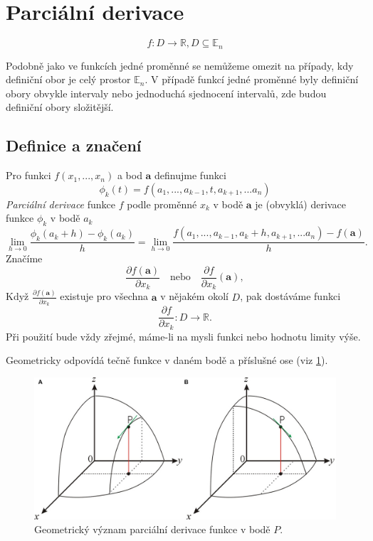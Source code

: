 \documentclass[../main.tex]{subfiles}
\begin{document}
\section{Parciální derivace}

\begin{definition}
	\[f: D \rightarrow \mathbb{R}, D \subseteq \mathbb{E}_n\]
\end{definition}

Podobně jako ve funkcích jedné proměnné se nemůžeme omezit na případy, kdy definiční obor je celý prostor $\mathbb{E}_n$.
V případě funkcí jedné proměnné byly definiční obory obvykle intervaly nebo jednoduchá sjednocení intervalů, zde budou definiční obory složitější.

\subsection{Definice a značení}
\begin{definition}
	Pro funkci $f(x_1,...,x_n)$ a bod \(\textbf{a}\) definujme funkci
	\[\phi_k(t) = f(a_1,...,a_{k-1},t,a_{k+1},...a_n)\]
	\textit{Parciální derivace} funkce $f$ podle proměnné $x_k$ v bodě $\textbf{a}$ je (obvyklá) derivace funkce $\phi_k$ v bodě \(a_k\)
	\[\lim_{h \rightarrow 0} \frac{\phi_k(a_k + h) - \phi_k(a_k)}{h} = \lim_{h\rightarrow 0}\frac{f(a_1,...,a_{k-1},a_k+h,a_{k+1},...a_n) - f(\textbf{a})}{h}.\]
	Značíme
	\[\frac{\partial f(\textbf{a})}{\partial x_k} \quad \textrm{nebo} \quad \frac{\partial f}{\partial x_k} (\textbf{a}),\]
	Když $\frac{\partial f(\textbf{a})}{\partial x_k}$ existuje pro všechna $\textbf{a}$ v nějakém okolí $D$, pak dostáváme funkci
	\[\frac{\partial f}{\partial x_k}: D \rightarrow \mathbb{R}.\]
	Při použití bude vždy zřejmé, máme-li na mysli funkci nebo hodnotu limity výše.
\end{definition}

\begin{intuition}
	Geometricky odpovídá tečně funkce v daném bodě a příslušné ose (viz \ref{fig:par}).
\end{intuition}

\begin{figure}[h]
	\centering
	\includegraphics[width=0.8\linewidth]{02-partial}%
	\caption{Geometrický význam parciální derivace funkce v bodě \(P\).}%
	\label{fig:par}
\end{figure}
\end{document}
